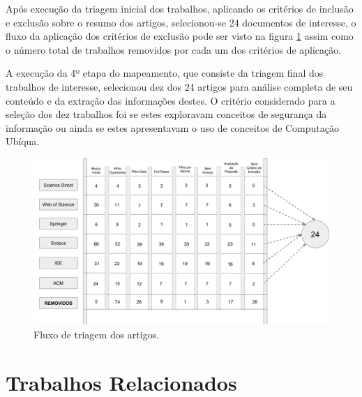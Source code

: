 \documentclass[ti,table]{texufpel} %
\begin{document}
  

  

Após execução da triagem inicial dos trabalhos, aplicando os critérios de inclusão e exclusão sobre o resumo dos artigos, selecionou-se 24 documentos de interesse, o fluxo da aplicação dos critérios de exclusão pode ser visto na figura \ref{fig:grafFluxoTriagemInicial} assim como o número total de trabalhos removidos por cada um dos critérios de aplicação.  

  

A execução da 4º etapa do mapeamento, que consiste da triagem final dos trabalhos de interesse, selecionou dez dos 24 artigos para análise completa de seu conteúdo e da extração das informações destes. O critério considerado para a seleção dos dez trabalhos foi se estes exploravam conceitos de segurança da informação ou ainda se estes apresentavam o uso de conceitos de Computação Ubíqua.  

  

  

\begin{landscape} 

\begin{figure}[ht] 

    \centering 

    \includegraphics[width=1.7\textwidth]{imagens/FluxoTriagemInicial.png} 

    \caption{Fluxo de triagem dos artigos.} 

    \label{fig:grafFluxoTriagemInicial} 

\end{figure} 

\end{landscape} 

  

  

\section{Trabalhos Relacionados} 
\end{document}
